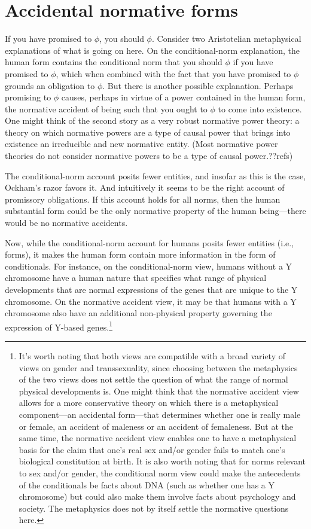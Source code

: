 \section{Accidental normative forms}
If you have promised to $\phi$, you should $\phi$. Consider two Aristotelian metaphysical explanations of what is going on here.
On the conditional-norm explanation, the human form contains the conditional norm that you should $\phi$ if you have promised 
to $\phi$, which when combined with the fact that you have promised to $\phi$ grounds an obligation to $\phi$. But there is
another possible explanation. Perhaps promising to $\phi$ causes, perhaps in virtue of a power contained in the human form, 
the normative accident of being such that you ought to $\phi$ to come into existence. One might think of the second story as 
a very robust normative power theory: a theory on which normative powers are a type of causal power that brings into existence
an irreducible and new normative entity. (Most normative power theories do not consider normative powers to be a type of 
causal power.??refs) 

The conditional-norm account posits fewer entities, and insofar as this is the case, Ockham's razor favors it. And intuitively
it seems to be the right account of promissory obligations. If this account holds for all norms, then the human substantial form could be 
the only normative property of the human being---there would be no normative accidents.

Now, while the conditional-norm account for humans
posits fewer entities (i.e., forms), it makes the human form contain more information in the form of conditionals.
For instance, on the conditional-norm view, humans without a Y chromosome have a human nature that specifies what
range of physical developments that are normal expressions of the genes that are unique to the Y chromosome. On the 
normative accident view, it may be that humans with a Y chromosome also have an additional non-physical property governing
the expression of Y-based genes.\footnote{It's worth noting that both views are compatible with a broad variety of views on gender and 
transsexuality, since choosing between the metaphysics of the two views does not settle the question of what the range
of normal physical developments is. One might think that the normative accident view allows for a more conservative
theory on which there is a metaphysical component---an accidental form---that determines whether one is really male or female, 
an accident of maleness or an accident of femaleness.  But at the same time, the normative accident view enables one to have 
a metaphysical basis for the claim that one's real sex and/or gender fails to match one's biological constitution at birth.
It is also worth noting that for norms relevant to sex and/or gender, the conditional norm view could make the antecedents 
of the conditionals be facts about DNA (such as whether one has a Y chromosome) but could also make them involve facts about 
psychology and society. The metaphysics does not by itself settle the normative questions here.}

